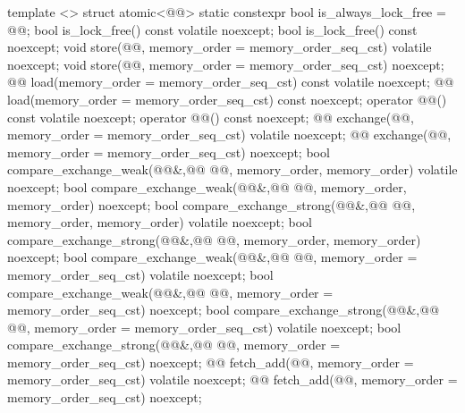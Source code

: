 \begin{codeblock}
{  template <> struct atomic<@@> {
    static constexpr bool is_always_lock_free = @@;
    bool is_lock_free() const volatile noexcept;
    bool is_lock_free() const noexcept;
    void store(@@, memory_order = memory_order_seq_cst) volatile noexcept;
    void store(@@, memory_order = memory_order_seq_cst) noexcept;
    @@ load(memory_order = memory_order_seq_cst) const volatile noexcept;
    @@ load(memory_order = memory_order_seq_cst) const noexcept;
    operator @@() const volatile noexcept;
    operator @@() const noexcept;
    @@ exchange(@@, memory_order = memory_order_seq_cst) volatile noexcept;
    @@ exchange(@@, memory_order = memory_order_seq_cst) noexcept;
    bool compare_exchange_weak(@@&,@\itcorr[-1]@ @@,
                               memory_order, memory_order) volatile noexcept;
    bool compare_exchange_weak(@@&,@\itcorr[-1]@ @@,
                               memory_order, memory_order) noexcept;
    bool compare_exchange_strong(@@&,@\itcorr[-1]@ @@,
                                 memory_order, memory_order) volatile noexcept;
    bool compare_exchange_strong(@@&,@\itcorr[-1]@ @@,
                                 memory_order, memory_order) noexcept;
    bool compare_exchange_weak(@@&,@\itcorr[-1]@ @@,
                               memory_order = memory_order_seq_cst) volatile noexcept;
    bool compare_exchange_weak(@@&,@\itcorr[-1]@ @@,
                               memory_order = memory_order_seq_cst) noexcept;
    bool compare_exchange_strong(@@&,@\itcorr[-1]@ @@,
                               memory_order = memory_order_seq_cst) volatile noexcept;
    bool compare_exchange_strong(@@&,@\itcorr[-1]@ @@,
                               memory_order = memory_order_seq_cst) noexcept;
    @@ fetch_add(@@, memory_order = memory_order_seq_cst) volatile noexcept;
    @@ fetch_add(@@, memory_order = memory_order_seq_cst) noexcept;
}}
\end{codeblock}
